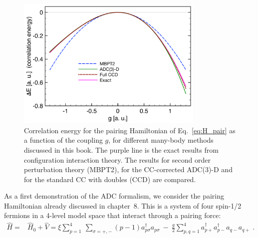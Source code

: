 \begin{figure}[ht]
\begin{center}
\includegraphics[width=0.8\textwidth]{Chapter11-figures/Pairing_LNP_ALL.pdf}
\caption{Correlation energy for the pairing Hamiltonian of Eq.~\eqref{eq:H_pair} as a function of the coupling $g$,  for  different
many-body methods discussed in this book. The purple line is the exact results from  configuration interaction theory. 
The results for  second order perturbation theory (MBPT2), for the  CC-corrected ADC(3)-D and  for the standard CC with doubles (CCD)  are compared.}
\label{fig:pairing_all}
\end{center}
\end{figure}

As a first demonstration  of the ADC formalism, we consider the pairing Hamiltonian already discussed in chapter~8. This is a system of  four spin-1/2 fermions in a 4-level model space that interact through a pairing force:
  \begin{align}
   \widehat{H} ={}& \widehat{H}_0 +  \widehat{V} = \xi \sum_{p=1}^4 ~ \sum_{\sigma=+, -} (p-1) a^{\dagger}_{p \sigma} a_{p \sigma}
 ~-~ \frac{g}{2} \sum_{p, q=1}^4 a^{\dagger}_{p+}a^{\dagger}_{p-}  a_{q-}a_{q+} \; .
\label{eq:H_pair}
\end{align}


